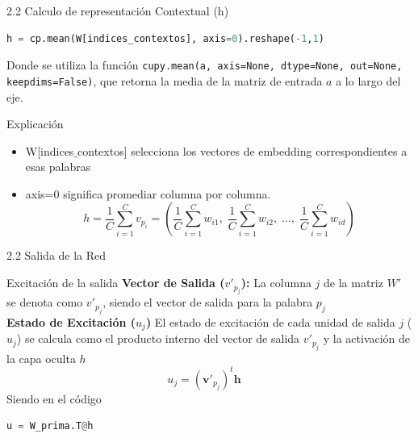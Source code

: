 \documentclass{beamer}
\begin{document}
	
\begin{frame}[fragile]{2.2 Calculo de representación Contextual (h)}

	\begin{lstlisting}[language=Python]
		h = cp.mean(W[indices_contextos], axis=0).reshape(-1,1)
	\end{lstlisting}
	Donde se utiliza la función \texttt{cupy.mean(a, axis=None, dtype=None, out=None, keepdims=False)}, que retorna la media de la matriz de entrada $a$ a lo largo del eje. 
	
	\begin{block}{Explicación}
	\begin{itemize}
	\item W[indices$\_$contextos] selecciona los vectores de embedding correspondientes a esas palabras\\
	\item axis=0 significa promediar columna por columna.
	\[
	h = \frac{1}{C} \sum_{i=1}^{C} v_{p_i}
	= \left(
	\frac{1}{C}\sum_{i=1}^C w_{i1}, \;
	\frac{1}{C}\sum_{i=1}^C w_{i2}, \;
	\dots, \;
	\frac{1}{C}\sum_{i=1}^C w_{id}
	\right)
	\]
\end{itemize}
	\end{block}
\end{frame}



\begin{frame}[fragile]{2.2 Salida de la Red}
	\begin{block}{Excitación de la salida}
\justifying
\textbf{ Vector de Salida ($v'_{p_j}$):} La columna $j$ de la matriz $W'$ se denota como $v'_{p_j}$, siendo el vector de salida para la palabra $p_j$\\
\vspace{0.3cm}
\textbf{Estado de Excitación ($u_j$)} El estado de excitación de cada unidad de salida $j$ ($u_j$) se calcula como el producto interno del vector de salida $v'_{p_j}$ y la activación de la capa oculta $h$\\
$$u_j = (\mathbf{v}'_{p_j})^t \mathbf{h} \quad$$
Siendo en el código
\begin{lstlisting}[language=Python]
	u = W_prima.T@h
\end{lstlisting}
	\end{block}
\end{frame}
	
\end{document}
